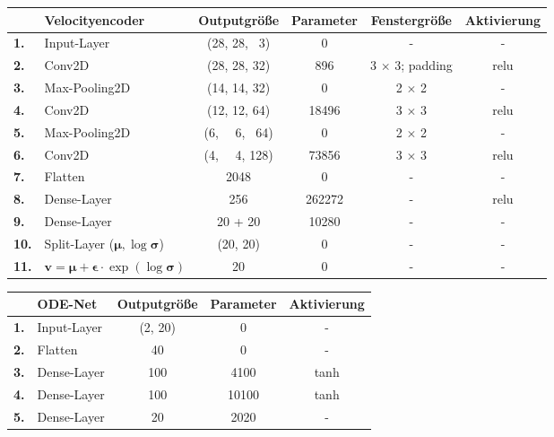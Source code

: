 \documentclass[12pt]{article}
\begin{document}
	\begin{table}[htb]
		\begin{center}
			\begin{tabular}{llcccc}\toprule
				\textbf{\ }	&\textbf{Velocityencoder}	&\textbf{Outputgröße} &\textbf{Parameter} &\textbf{Fenstergröße} &\textbf{Aktivierung}\\
				\midrule
				\textbf{1.}	&Input-Layer	& (28, 28, \ 3)		& 0		& - 			&- \\
				\textbf{2.}	&Conv2D 		& (28, 28, 32)		& 896	& 3 $\times$ 3; padding	&relu \\
				\textbf{3.}	&Max-Pooling2D	& (14, 14, 32)		& 0		& 2 $\times$ 2	&- \\
				\textbf{4.}	&Conv2D			& (12, 12, 64)		& 18496	& 3 $\times$ 3	&relu \\
				\textbf{5.}	&Max-Pooling2D	& (6, \ \ 6, \ 64)	& 0		& 2 $\times$ 2 	&- \\
				\textbf{6.}	&Conv2D		& (4, \ \ 4,  128)	& 73856	& 3 $\times$ 3 	&relu \\
				\textbf{7.}	&Flatten		& 2048				& 0		& - 			&- \\
				\textbf{8.}	&Dense-Layer			& 256				& 262272	& - 			&relu \\
				\textbf{9.}	&Dense-Layer 			& 20 + 20				& 10280	& - 			&- \\
				\textbf{10.}	&Split-Layer	($\boldsymbol{\mu}, \log\boldsymbol{\sigma}$)	& (20, 20)				& 0	& - 			&- \\
				\textbf{11.}&$\mathbf{v}=\boldsymbol{\mu}+\boldsymbol{\epsilon}\cdot\exp(\log\boldsymbol{\sigma})$		& 20				& 0	& - 			&-\\
				\bottomrule
			\end{tabular}
		\end{center}
	\end{table}

	\begin{table}[htb]
		\begin{center}
			\begin{tabular}{llccc}\toprule
				\textbf{\ }	&\textbf{ODE-Net}	&\textbf{Outputgröße} &\textbf{Parameter}  &\textbf{Aktivierung}\\
				\midrule
				\textbf{1.}	&Input-Layer	& (2, 20)		& 0			&- \\
				\textbf{2.}	&Flatten	 	& 40			& 0			&- \\
				\textbf{3.}	&Dense-Layer			& 100			& 4100		&tanh \\
				\textbf{4.}	&Dense-Layer			& 100			& 10100		&tanh \\
				\textbf{5.}	&Dense-Layer			& 20			& 2020		&- \\
				\bottomrule
			\end{tabular}
		\end{center}
	\end{table}
\end{document}
